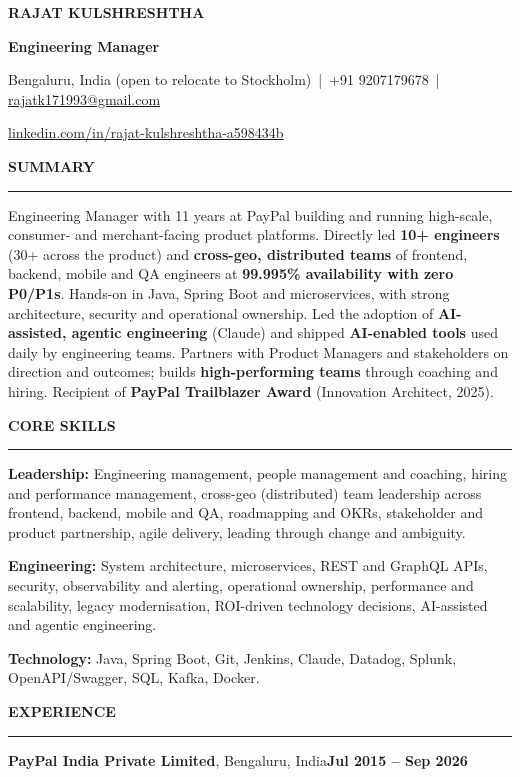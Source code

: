 \documentclass[10pt,a4paper]{article}
\renewcommand{\normalsize}{\fontsize{10}{12.1}\selectfont}
\newcommand{\bd}[1]{\textbf{#1}}
\newcommand{\sect}[1]{%
  \par\vspace{8pt}%
  {\bfseries\fontsize{10.8}{12.5}\selectfont #1}\par\nointerlineskip
  \vspace{1.5pt}\noindent\rule{\linewidth}{0.6pt}\par\vspace{4pt}}
\newcommand{\company}[3]{%
  \par\vspace{1pt}\noindent\textbf{#1}, #2\hfill\textbf{#3}\par\nopagebreak}
\begin{document}
\normalsize

\centerline{\bfseries\fontsize{17}{19}\selectfont RAJAT KULSHRESHTHA}
\vspace{2pt}
\centerline{\bfseries\fontsize{11}{13}\selectfont Engineering Manager}
\vspace{3pt}
\centerline{Bengaluru, India (open to relocate to Stockholm) \,|\, +91 9207179678 \,|\,
  \href{mailto:rajatk171993@gmail.com}{rajatk171993@gmail.com}}
\vspace{1.5pt}
\centerline{\href{https://www.linkedin.com/in/rajat-kulshreshtha-a598434b/}{linkedin.com/in/rajat-kulshreshtha-a598434b}}

\sect{SUMMARY}
Engineering Manager with 11 years at PayPal building and running high-scale, consumer- and
merchant-facing product platforms. Directly led \bd{10+ engineers} (30+ across the product) and
\bd{cross-geo, distributed teams} of frontend, backend, mobile and QA engineers at
\bd{99.995\% availability with zero P0/P1s}.
Hands-on in Java, Spring Boot and microservices, with strong architecture, security and
operational ownership. Led the adoption of \bd{AI-assisted, agentic engineering} (Claude) and
shipped \bd{AI-enabled tools} used daily by engineering teams. Partners with Product Managers and
stakeholders on direction and outcomes; builds \bd{high-performing teams} through coaching and
hiring. Recipient of \bd{PayPal Trailblazer Award} (Innovation Architect, 2025).

\sect{CORE SKILLS}
\textbf{Leadership:} Engineering management, people management and coaching, hiring and
performance management, cross-geo (distributed) team leadership across frontend, backend,
mobile and QA, roadmapping and OKRs, stakeholder and
product partnership, agile delivery, leading through change and ambiguity.\par\vspace{2pt}
\textbf{Engineering:} System architecture, microservices, REST and GraphQL APIs, security,
observability and alerting, operational ownership, performance and scalability, legacy
modernisation, ROI-driven technology decisions, AI-assisted and agentic engineering.\par\vspace{2pt}
\textbf{Technology:} Java, Spring Boot, Git, Jenkins, Claude, Datadog, Splunk, OpenAPI/Swagger, SQL, Kafka, Docker.

\sect{EXPERIENCE}
\company{PayPal India Private Limited}{Bengaluru, India}{Jul 2015 -- Sep 2026}
\end{document}
